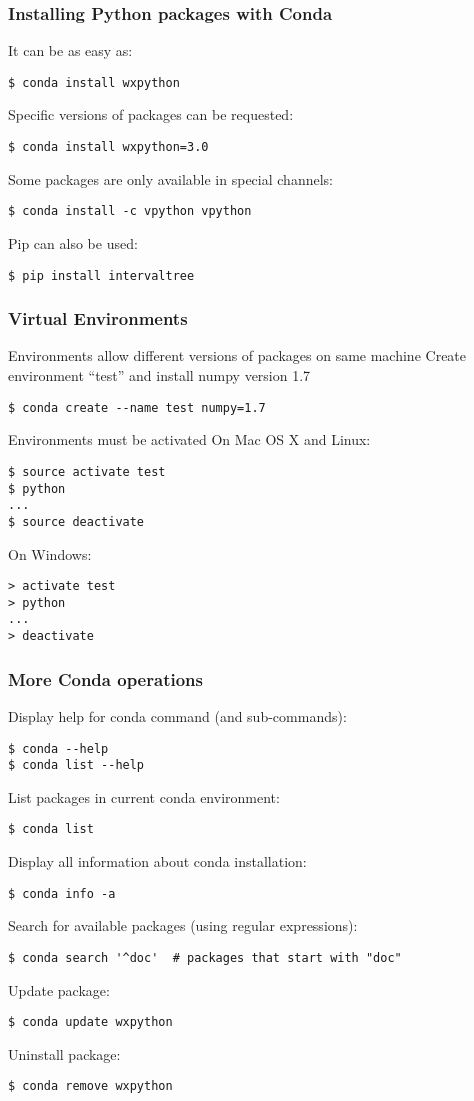 \documentclass[10pt]{beamer}
\begin{document}
\begin{frame}[fragile]
\frametitle{Installing Python packages with Conda}
It can be as easy as:
\begin{verbatim}
$ conda install wxpython
\end{verbatim}
Specific versions of packages can be requested:
\begin{verbatim}
$ conda install wxpython=3.0
\end{verbatim}
Some packages are only available in special channels:
\begin{verbatim}
$ conda install -c vpython vpython
\end{verbatim}
Pip can also be used:
\begin{verbatim}
$ pip install intervaltree
\end{verbatim}
\end{frame}

\begin{frame}[fragile]
\frametitle{Virtual Environments}
Environments allow different versions of packages on same machine
\vskip10pt
Create environment ``test'' and install numpy version 1.7
\begin{verbatim}
$ conda create --name test numpy=1.7
\end{verbatim}
Environments must be activated
\vskip10pt
On Mac OS X and Linux:
\begin{verbatim}
$ source activate test
$ python
...
$ source deactivate
\end{verbatim}
On Windows:
\begin{verbatim}
> activate test
> python
...
> deactivate
\end{verbatim}
\end{frame}

\begin{frame}[fragile]
\frametitle{More Conda operations}
Display help for conda command (and sub-commands):
\begin{verbatim}
$ conda --help
$ conda list --help
\end{verbatim}
List packages in current conda environment:
\begin{verbatim}
$ conda list
\end{verbatim}
Display all information about conda installation:
\begin{verbatim}
$ conda info -a
\end{verbatim}
Search for available packages (using regular expressions):
\begin{verbatim}
$ conda search '^doc'  # packages that start with "doc"
\end{verbatim}
Update package:
\begin{verbatim}
$ conda update wxpython
\end{verbatim}
Uninstall package:
\begin{verbatim}
$ conda remove wxpython
\end{verbatim}
\end{frame}
\end{document}
